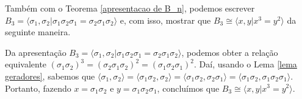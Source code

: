 	\par\vspace{0.3cm} Também com o Teorema \eqref{apresentacao de B_n}, podemos escrever $B_3 = \langle \sigma_1,\sigma_2 | \sigma_1\sigma_2\sigma_1 = \sigma_2\sigma_1\sigma_2 \rangle$ e, com isso, mostrar que $B_3 \cong\langle x,y | x^3=y^2 \rangle$ da seguinte maneira.
	
	\par\vspace{0.3cm} Da apresentação $B_3 = \langle \sigma_1,\sigma_2 | \sigma_1\sigma_2\sigma_1 = \sigma_2\sigma_1\sigma_2 \rangle$, podemos obter a relação equivalente $(\sigma_1\sigma_2)^3 = (\sigma_2\sigma_1\sigma_2)^2 = (\sigma_1\sigma_2\sigma_1)^2$. Daí, usando o Lema \eqref{lema geradores}, sabemos que $\langle \sigma_1,\sigma_2 \rangle = \langle \sigma_1\sigma_2,\sigma_2 \rangle = \langle \sigma_1\sigma_2, \sigma_2\sigma_1 \rangle = \langle \sigma_1\sigma_2, \sigma_1\sigma_2\sigma_1 \rangle$. Portanto, fazendo $x = \sigma_1\sigma_2$ e $y = \sigma_1\sigma_2\sigma_1$, concluímos que $B_3 \cong \langle x,y | x^3=y^2 \rangle$.
	
	
	
	
	
	
	
